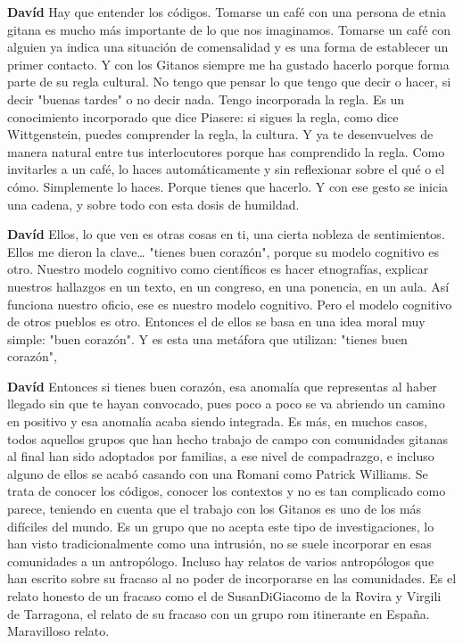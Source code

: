 \documentclass[
  spanish,
  11pt,
  a4paper,
]{scrbook}
\newenvironment{transcripcion}{
    \begin{list}{}{
        \setlength{\leftmargin}{1.5em}  %
        \setlength{\rightmargin}{0em}
        \setlength{\itemsep}{0.2em}     %
        \setlength{\parsep}{0.0em}
        \setlength{\listparindent}{0pt}
    }
}{
    \end{list}
}
\newcommand{\personaje}[1]{\textbf{#1}\quad}
\begin{document}
\begin{transcripcion}
\item \personaje{Davíd} Hay que entender los códigos. Tomarse un café con una persona de etnia gitana es mucho más importante de lo que nos imaginamos. Tomarse un café con alguien ya indica una situación de comensalidad y es una forma de establecer un primer contacto. Y con los Gitanos siempre me ha gustado hacerlo porque forma parte de su regla cultural. No tengo que pensar lo que tengo que decir o hacer, si decir "buenas tardes" o no decir nada. Tengo incorporada la regla. Es un conocimiento incorporado que dice Piasere: si sigues la regla, como dice Wittgenstein, puedes comprender la regla, la cultura. Y ya te desenvuelves de manera natural entre tus interlocutores porque has comprendido la regla. Como invitarles a un café, lo haces automáticamente y sin reflexionar sobre el qué o el cómo. Simplemente lo haces. Porque tienes que hacerlo. Y con ese gesto se inicia una cadena, y sobre todo con esta dosis de humildad.

\item \personaje{Davíd} Ellos, lo que ven es otras cosas en ti, una cierta nobleza de sentimientos. Ellos me dieron la clave… "tienes buen corazón", porque su modelo cognitivo es otro. Nuestro modelo cognitivo como científicos es hacer etnografías, explicar nuestros hallazgos en un texto, en un congreso, en una ponencia, en un aula. Así funciona nuestro oficio, ese es nuestro modelo cognitivo. Pero el modelo cognitivo de otros pueblos es otro. Entonces el de ellos se basa en una idea moral muy simple: "buen corazón". Y es esta una metáfora que utilizan: "tienes buen corazón",

\item \personaje{Davíd} Entonces si tienes buen corazón, esa anomalía que representas al haber llegado sin que te hayan convocado, pues poco a poco se va abriendo un camino en positivo y esa anomalía acaba siendo integrada. Es más, en muchos casos, todos aquellos grupos que han hecho trabajo de campo con comunidades gitanas al final han sido adoptados por familias, a ese nivel de compadrazgo, e incluso alguno de ellos se acabó casando con una Romani como Patrick Williams. Se trata de conocer los códigos, conocer los contextos y no es tan complicado como parece, teniendo en cuenta que el trabajo con los Gitanos es uno de los más difíciles del mundo. Es un grupo que no acepta este tipo de investigaciones, lo han visto tradicionalmente como una intrusión, no se suele incorporar en esas comunidades a un antropólogo. Incluso hay relatos de varios antropólogos que han escrito sobre su fracaso al no poder de incorporarse en las comunidades. Es el relato honesto de un fracaso como el de SusanDiGiacomo de la Rovira y Virgili de Tarragona, el relato de su fracaso con un grupo rom itinerante en España. Maravilloso relato.


\end{transcripcion}
\end{document}
